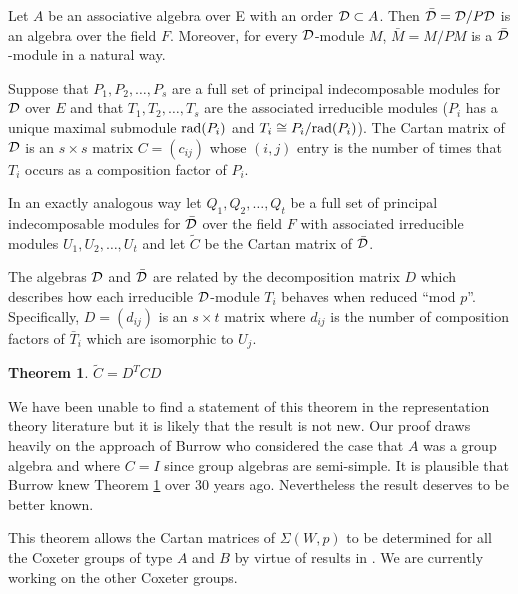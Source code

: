 \documentclass[10pt]{article}
\newtheorem{theorem}{Theorem}
\newcommand{\rad}{\textup{rad}}
\begin{document}
Let $A$ be an associative algebra over E with an order ${\cal
D}\subset A$.  Then $\bar{\cal D}={\cal D}/P{\cal D}$ is an algebra
over the field $F$.  Moreover, for every ${\cal D}$-module $M$,
$\bar{M}=M/PM$ is a $\bar{\cal D}$-module in a natural way.

Suppose that $P_{1},P_{2},\ldots,P_{s}$ are a full set of principal
indecomposable modules for ${\cal D}$ over $E$ and that
$T_{1},T_{2},\ldots,T_{s}$ are the associated irreducible modules
($P_{i}$ has a unique maximal submodule $\rad(P_{i})$ and
 $T_{i}\cong P_{i}/\rad(P_{i})$).  The Cartan matrix of ${\cal
D}$ is an $s\times s$ matrix $C=(c_{ij})$ whose $(i,j)$ entry is the
number of times that $T_{i}$ occurs as a composition factor of
$P_{i}$.

In an exactly analogous way let $Q_{1},Q_{2},\ldots,Q_{t}$ be a full
set of principal indecomposable modules for $\bar{\cal D}$ over the
field $F$ with associated irreducible modules
$U_{1},U_{2},\ldots,U_{t}$ and let $\tilde{C}$
 be the
Cartan matrix
 of $\bar{\cal D}$.

The algebras ${\cal D}$ and $\bar{\cal D}$ are related by the
decomposition matrix $D$ which describes how each irreducible ${\cal
D}$-module $T_{i}$ behaves when reduced ``mod $p$''.  Specifically,
$D=(d_{ij})$
is an $s\times t$ matrix where $d_{ij}$ is the number of composition
factors of $\bar{T}_{i}$ which are isomorphic to $U_{j}$.

\begin{theorem}
\label{C=DCD}
 $\tilde{C}=D^{T}CD$
\end{theorem}

We have been unable to find a statement of this theorem in the
representation theory literature but it is likely that the result is
not new.  Our proof draws heavily on the approach of
Burrow  \cite{Bur} who considered the case that $A$ was a group algebra
and where $C=I$ since group algebras are semi-simple.
It is plausible that Burrow knew Theorem
\ref{C=DCD} over 30 years ago.  Nevertheless the result deserves to be
better known.


This theorem allows the Cartan matrices of
$\Sigma(W,p)$ to be determined for all the Coxeter groups of type $A$
and $B$ by virtue of results in \cite{G&R,B&B,Ber}.  We
are currently working on the other Coxeter groups.
\end{document}
